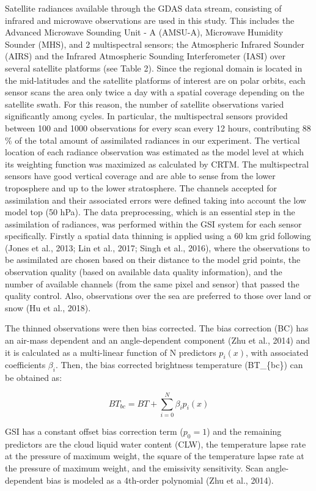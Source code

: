 \documentclass[final,5p,times,twocolumn,authoryear]{elsarticle} %
\begin{document}
Satellite radiances available through the GDAS data stream, consisting of infrared and microwave observations are used in this study. This includes the Advanced Microwave Sounding Unit - A (AMSU-A), Microwave Humidity Sounder (MHS), and 2 multispectral sensors; the Atmospheric Infrared Sounder (AIRS) and the Infrared Atmospheric Sounding Interferometer (IASI) over several satellite platforms (see Table 2). Since the regional domain is located in the mid-latitudes and the satellite platforms of interest are on polar orbits, each sensor scans the area only twice a day with a spatial coverage depending on the satellite swath. For this reason, the number of satellite observations varied significantly among cycles. In particular, the multispectral sensors provided between 100 and 1000 observations for every scan every 12 hours, contributing 88 \% of the total amount of assimilated radiances in our experiment. The vertical location of each radiance observation was estimated as the model level at which its weighting function was maximized as calculated by CRTM. The multispectral sensors have good vertical coverage and are able to sense from the lower troposphere and up to the lower stratosphere.
The channels accepted for assimilation and their associated errors were defined taking into account the low model top (50 hPa). The data preprocessing, which is an essential step in the assimilation of radiances, was performed within the GSI system for each sensor specifically. Firstly a spatial data thinning is applied using a 60 km grid following (Jones et al., 2013; Lin et al., 2017; Singh et al., 2016), where the observations to be assimilated are chosen based on their distance to the model grid points, the observation quality (based on available data quality information), and the number of available channels (from the same pixel and sensor) that passed the quality control. Also, observations over the sea are preferred to those over land or snow (Hu et al., 2018).

The thinned observations were then bias corrected. The bias correction (BC) has an air-mass dependent and an angle-dependent component (Zhu et al., 2014) and it is calculated as a multi-linear function of N predictors \(p_i(x)\), with associated coefficients \(\beta_i\). Then, the bias corrected brightness temperature (BT\_\{bc\}) can be obtained as:

\[\mathit{BT_{bc}} =\mathit{ BT} + \sum_{i = 0}^{N} \beta_i p_i (x)\]

GSI has a constant offset bias correction term (\(p_0 = 1\)) and the remaining predictors are the cloud liquid water content (CLW), the temperature lapse rate at the pressure of maximum weight, the square of the temperature lapse rate at the pressure of maximum weight, and the emissivity sensitivity. Scan angle-dependent bias is modeled as a 4th-order polynomial (Zhu et al., 2014).
\end{document}
